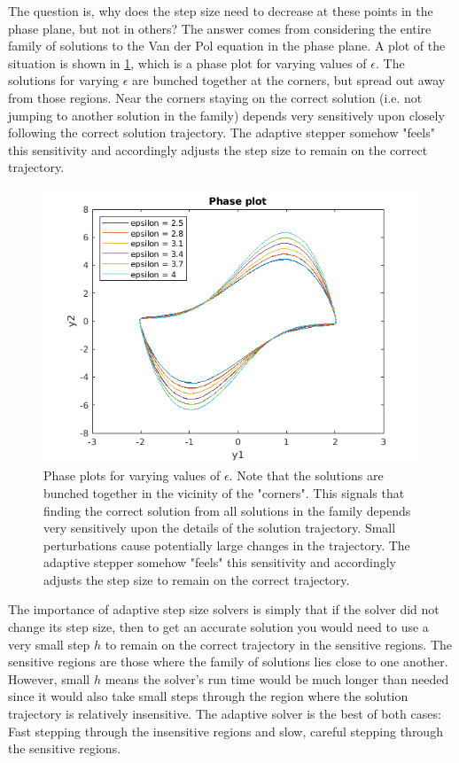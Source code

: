 \documentclass[hidelinks,notitlepage]{book}
\begin{document}
The question is, why does the step size need to decrease at these points in the phase plane, but not in others?  The answer comes from considering the entire family of solutions to the Van der Pol equation in the phase plane.  A plot of the situation is shown in \cref{fig:VanDerPolPhasePlots}, which is a phase plot for varying values of $\epsilon$.  The solutions for varying $\epsilon$ are bunched together at the corners, but spread out away from those regions.  Near the corners staying on the correct solution (i.e. not jumping to another solution in the family) depends very sensitively upon closely following the correct solution trajectory.  The adaptive stepper somehow "feels" this sensitivity and accordingly adjusts the step size to remain on the correct trajectory. 
\begin{figure}[th]
	\centering
	\includegraphics[width=0.7\columnwidth]{VanDerPolPhasePlots.png}
	\caption{Phase plots for varying values of $\epsilon$.  Note that the solutions are bunched together in the vicinity of the "corners".  This signals that finding the correct solution from all solutions in the family depends very sensitively upon the details of the solution trajectory.  Small perturbations cause potentially large changes in the trajectory.  The adaptive stepper somehow "feels" this sensitivity and accordingly adjusts the step size to remain on the correct trajectory. }
	\label{fig:VanDerPolPhasePlots}
\end{figure}
The importance of adaptive step size solvers is simply that if the solver did not change its step size, then to get an accurate solution you would need to use a very small step $h$ to remain on the correct trajectory in the sensitive regions.  The sensitive regions are those where the family of solutions lies close to one another.  However, small $h$ means the solver's run time would be much longer than needed since it would also take small steps through the region where the solution trajectory is relatively insensitive.  The adaptive solver is the best of both cases:  Fast stepping through the insensitive regions and slow, careful stepping through the sensitive regions.
\end{document}
